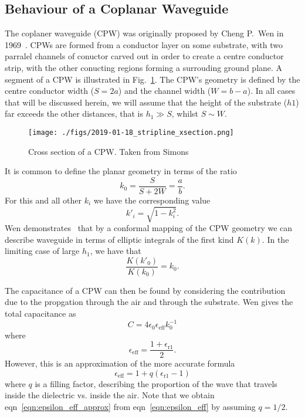 \subsection{Behaviour of a Coplanar Waveguide}

The coplaner waveguide (CPW) was originally proposed by Cheng P.~Wen in
1969~\cite{1127105}. CPWs are formed from a conductor layer on some substrate,
with two parralel channels of conuctor carved out in order to create a centre
conductor strip, with the other conucting regions forming a surrouding ground
plane. A segment of a CPW is illustrated in Fig.~\ref{fig:CPWxsec}. The
CPW's geometry is defined by the centre conductor width ($S=2a$) and the channel
width ($W=b-a$). In all cases that will be discussed herein, we will assume that
the height of the substrate ($h1$) far exceeds the other distances, that is $h_1
\gg S$, whilst $S \sim W$.

\begin{figure}
  \texttt{[image: ./figs/2019-01-18\_stripline\_xsection.png]}
  \caption{Cross section of a CPW. Taken from Simons~\cite{Simons2004}}
  \label{fig:CPWxsec}
\end{figure}

It is common to define the planar geometry in terms of the
ratio~\cite{1127105, Simons2004}
\begin{equation}
  k_0 = \frac{S}{S+2W} = \frac{a}{b}.
  \label{eqn:k0def}
\end{equation}
For this and all other $k_i$ we have the corresponding value
\begin{equation}
  k'_i = \sqrt{1-k^2_i}.
\end{equation}
Wen demonstrates~\cite{1127105} that by a conformal mapping of the CPW geometry
we can describe waveguide in terms of elliptic integrals of the first kind
$K(k)$. In the limiting case of large $h_1$, we have that
\begin{equation}
  \frac{K(k'_0)}{K(k_0)} = k_0.
  \label{eqn:k0rat}
\end{equation}

The capacitance of a CPW can then be found by considering the contribution due
to the propgation through the air and through the substrate. Wen gives the
total capacitance as~\cite{Simons2004}
\begin{equation}
  C = 4\epsilon_0\epsilon_\mathrm{eff} k_0^{-1}
\end{equation}
where
\begin{equation}
  \epsilon_\mathrm{eff} = \frac{1 + \epsilon_\mathrm{r1}}{2}.
  \label{eqn:epsilon_eff_approx}
\end{equation}
However, this is an approximation of the more accurate
formula~\cite{Simons2004}
\begin{equation}
  \epsilon_\mathrm{eff} = 1 + q(\epsilon_\mathrm{r1} - 1)
  \label{eqn:epsilon_eff}
\end{equation}
where $q$ is a filling factor, describing the proportion of the wave that
travels inside the dielectric vs. inside the air. Note that we obtain
eqn~\ref{eqn:epsilon_eff_approx} from eqn~\ref{eqn:epsilon_eff} by assuming $q =
1/2$.

